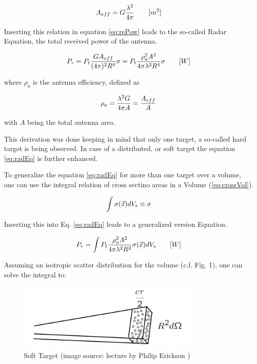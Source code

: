 \begin{equation}
\label{eq:Aeff}
	\centering
	A_{eff} = G \frac{\lambda^2}{4\pi} \qquad [m^2]
\end{equation}

Inserting this relation in equation \ref{eq:rePow} leads to the so-called Radar Equation, the total received power of the antenna.

\begin{equation}
\label{eq:radEq}
	\centering
	P_{r} =  P_t \frac{G A_{eff}}{(4\pi)^2 R^4} \sigma = P_t \frac{\rho_a^2 A^2 }{4 \pi \lambda^2 R^4} \sigma \qquad [W]
\end{equation}

where $\rho_{a} $ is the antenna efficiency, defined as

\begin{equation}
\label{eq:effi}
	\centering
	\rho_a = \frac{\lambda^2 G }{4 \pi A} = \frac{A_{eff}}{A}
\end{equation}

with $A$ being the total antenna area.

This derivation was done keeping in mind that only one target, a so-called hard target is being observed. In case of a distributed, or soft target the equation \ref{eq:radEq} is further enhanced.

To generalize the equation \ref{eq:radEq} for more than one target over a volume, one can use the integral relation of cross sectino areas in a Volume (\ref{eq:crossVol}).

\begin{equation}
	\label{eq:crossVol}
	\centering
	\int \sigma(\vec{x}) dV_s \equiv \sigma
\end{equation}

Inserting this into Eq. \ref{eq:radEq} leads to a generalized version Equation.

\begin{equation}
\label{eq:radEqGen}
	\centering
	P_{r} = \int P_t \frac{\rho_a^2 A^2 }{4 \pi \lambda^2 R^2} \sigma(\vec{x}) dV_s \qquad [W]
\end{equation}




Assuming an isotropic scatter distribution for the volume (c.f. Fig. 1), one can solve the integral to:

\begin{figure}
	\centering
	\label{fig:softTarget}
	\includegraphics[width=0.8\textwidth]{images/softTarget}
	\caption{Soft Target (image source: lecture by Philip Erickson \citep{erickson:lecture})}
\end{figure}

